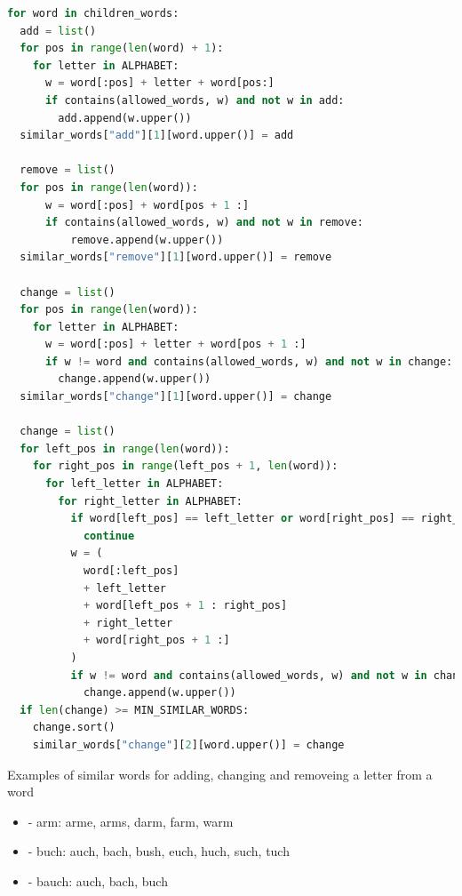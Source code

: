 \begin{lstlisting}[language=Python,caption={Algorithm to generate a list of similar words in Python},label={lst:similarWords}]
for word in children_words:
  add = list()
  for pos in range(len(word) + 1):
    for letter in ALPHABET:
      w = word[:pos] + letter + word[pos:]
      if contains(allowed_words, w) and not w in add:
        add.append(w.upper())
  similar_words["add"][1][word.upper()] = add

  remove = list()
  for pos in range(len(word)):
      w = word[:pos] + word[pos + 1 :]
      if contains(allowed_words, w) and not w in remove:
          remove.append(w.upper())
  similar_words["remove"][1][word.upper()] = remove

  change = list()
  for pos in range(len(word)):
    for letter in ALPHABET:
      w = word[:pos] + letter + word[pos + 1 :]
      if w != word and contains(allowed_words, w) and not w in change:
        change.append(w.upper())
  similar_words["change"][1][word.upper()] = change

  change = list()
  for left_pos in range(len(word)):
    for right_pos in range(left_pos + 1, len(word)):
      for left_letter in ALPHABET:
        for right_letter in ALPHABET:
          if word[left_pos] == left_letter or word[right_pos] == right_letter:
            continue
          w = (
            word[:left_pos]
            + left_letter
            + word[left_pos + 1 : right_pos]
            + right_letter
            + word[right_pos + 1 :]
          )
          if w != word and contains(allowed_words, w) and not w in change:
            change.append(w.upper())
  if len(change) >= MIN_SIMILAR_WORDS:
    change.sort()
    similar_words["change"][2][word.upper()] = change
\end{lstlisting}

\begin{example}
  Examples of similar words for adding, changing and removeing a letter from a word
  \begin{itemize}
    \item {} - arm: arme, arms, darm, farm, warm
    \item {} - buch: auch, bach, bush, euch, huch, such, tuch
    \item {} - bauch: auch, bach, buch
  \end{itemize}
\end{example}

